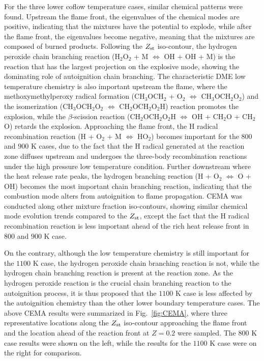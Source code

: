 \documentclass[review,3p,times]{elsarticleUS}
\begin{document}
For the three lower coflow temperature cases, similar chemical patterns were found.  Upstream the flame front, the eigenvalues of the chemical modes are positive, indicating that the mixtures have the potential to explode, while after the flame front, the eigenvalues become negative, meaning that the mixtures are composed of burned products.  Following the $Z_{\rm st}$ iso-contour, the hydrogen peroxide chain branching reaction (H$_2$O$_2$ + M $\Longleftrightarrow$ OH + OH + M) is the reaction that has the largest projection on the explosive mode, showing the dominating role of autoignition chain branching.  The characteristic DME low temperature chemistry is also important upstream the flame, where the methoxymethylperoxy radical formation (CH$_3$OCH$_2$ + O$_2$ $\Longleftrightarrow$ CH$_3$OCH$_2$O$_2$) and the isomerization (CH$_3$OCH$_2$O$_2$ $\Longleftrightarrow$ CH$_2$OCH$_2$O$_2$H) reaction promotes the explosion, while the $\beta$-scission reaction (CH$_2$OCH$_2$O$_2$H $\Longleftrightarrow$ OH + CH$_2$O + CH$_2$O) retards the explosion.  Approaching the flame front, the H radical recombination reaction (H + O$_2$ + M $\Longleftrightarrow$ HO$_2$) becomes important for the $800$ and $900$ K cases, due to the fact that the H radical generated at the reaction zone diffuses upstream and undergoes the three-body recombination reactions under the high pressure low temperature condition.  Further downstream where the heat release rate peaks, the hydrogen branching reaction (H + O$_2$ $\Longleftrightarrow$ O + OH) becomes the most important chain branching reaction, indicating that the combustion mode alters from autoignition to flame propagation.  CEMA was conducted along other mixture fraction iso-contours, showing similar chemical mode evolution trends compared to the $Z_{\rm st}$, except the fact that the H radical recombination reaction is less important ahead of the rich heat release front in $800$ and $900$ K case.

On the contrary, although the low temperature chemistry is still important for the $1100$ K case, the hydrogen peroxide chain branching reaction is not, while the hydrogen chain branching reaction is present at the reaction zone.  As the hydrogen peroxide reaction is the crucial chain branching reaction to the autoignition process, it is thus proposed that the $1100$ K case is less affected by the autoignition chemistry than the other lower boundary temperature cases.  The above CEMA results were summarized in Fig.~\ref{fig:CEMA}, where three representative locations along the $Z_{\rm st}$ iso-contour approaching the flame front and the location ahead of the reaction front at $Z = 0.2$ were sampled.  The $800$ K case results were shown on the left, while the results for the $1100$ K case were on the right for comparison.   
\end{document}
